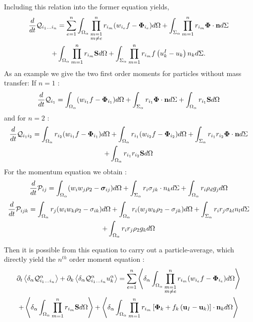 Including this relation into the former equation yields, 
\begin{multline}
    \frac{d}{d t} \mathcal{Q}_{i_1\ldots i_n}
    = \sum_{e=1}^{n} \int_{\Omega_\alpha} \prod^{n}_{\substack{ m=1 \\   m \neq e}} r_{i_m} (w_{i_e}f  - \mathbf{\Phi}_{i_e})d\Omega
    +\int_{\Sigma_\alpha} \prod_{m=1}^{n} r_{i_m} \mathbf{\Phi} \cdot \textbf{n}d\Sigma\\
    + \int_{\Omega_\alpha} \prod_{m=1}^{n} r_{i_m} \textbf{S} d\Omega
    +\int_{\Sigma_\alpha} \prod_{m=1}^{n} r_{i_m} f \left(u^I_k - u_k\right) n_k d\Sigma.
    \label{eq:dt_Q_n}
\end{multline}
As an example we give the two first order moments for particles without mass transfer: 
If $n=1$ : 
\begin{equation}
    \frac{d}{d t} \mathcal{Q}_{i_1}
    = \int_{\Omega_\alpha} (w_{i_1}f  - \mathbf{\Phi}_{i_1})d\Omega
    +\int_{\Sigma_\alpha} r_{i_1}\mathbf{\Phi} \cdot \textbf{n}d\Sigma
    + \int_{\Omega_\alpha}r_{i_1} \textbf{S} d\Omega
\end{equation}
and for $n=2$ : 
\begin{multline*}
    \frac{d}{d t} \mathcal{Q}_{i_1 i_2}
    = 
    \int_{\Omega_\alpha} r_{i_2} (w_{i_1}f  - \mathbf{\Phi}_{i_1})d\Omega
    +\int_{\Omega_\alpha} r_{i_1} (w_{i_2}f  - \mathbf{\Phi}_{i_2})d\Omega
    +\int_{\Sigma_\alpha}  r_{i_1}r_{i_2} \mathbf{\Phi} \cdot \textbf{n}d\Sigma\\
    + \int_{\Omega_\alpha} r_{i_1}r_{i_2}  \textbf{S} d\Omega
\end{multline*}
For the momentum equation we obtain : 
\begin{equation}
    \frac{d}{d t} \mathcal{P}_{ij}
    = \int_{\Omega_\alpha} (w_{i}w_j \rho_2  - \bm{\sigma}_{ij})d\Omega
    +\int_{\Sigma_\alpha} r_{i} \sigma_{jk} \cdot n_k d\Sigma
    + \int_{\Omega_\alpha}r_{i} \rho_d g_j d\Omega
\end{equation}
\begin{multline*}
    \frac{d}{d t} \mathcal{P}_{i j k}
    = 
    \int_{\Omega_\alpha} r_{j} (w_{i} w_k\rho_2 - \sigma_{ik})d\Omega
    +\int_{\Omega_\alpha} r_{i} (w_{j} w_k\rho_2 - \sigma_{jk})d\Omega
    +\int_{\Sigma_\alpha}  r_{i}r_{j} \sigma_{kl} n_l d\Sigma\\
    + \int_{\Omega_\alpha} r_{i}r_{j}  \rho_2 g_k d\Omega
\end{multline*}


Then it is possible from this equation to carry out a particle-average, which directly yield the $n^{th}$ order moment equation : 
\begin{multline*}
    \partial_t \left<\delta_\alpha \mathcal{Q}_{i_1\ldots i_n}^\alpha\right>
    + \partial_k  \left<\delta_\alpha \mathcal{Q}_{i_1\ldots i_n}^\alpha u_k^\alpha\right>
    = \sum_{e=1}^{n} \left<\delta_\alpha \int_{\Omega_\alpha} \prod^{n}_{\substack{ m=1 \\   m \neq e}} r_{i_m} (w_{i_e}f  - \mathbf{\Phi}_{i_e})d\Omega\right>\\
    + \left<\delta_\alpha \int_{\Omega_\alpha} \prod_{m=1}^{n} r_{i_m} \textbf{S} d\Omega\right>
    + \left<\delta_\alpha \int_{\Omega_\alpha} \prod_{m=1}^{n} r_{i_m} \left[
            \mathbf{\Phi}_k
            + f_k
            \left(
                \textbf{u}_I
                - \textbf{u}_k
            \right)
        \right]
        \cdot \textbf{n}_kd\Omega\right>
\end{multline*}
